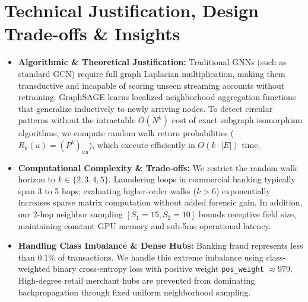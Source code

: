 \documentclass[11pt, a4paper]{article}
\begin{document}
\section{Technical Justification, Design Trade-offs \& Insights}
\begin{itemize}[noitemsep, topsep=2pt]
    \item \textbf{Algorithmic \& Theoretical Justification:} Traditional GNNs (such as standard GCN) require full graph Laplacian multiplication, making them transductive and incapable of scoring unseen streaming accounts without retraining. GraphSAGE learns localized neighborhood aggregation functions that generalize inductively to newly arriving nodes. To detect circular patterns without the intractable $O(N^k)$ cost of exact subgraph isomorphism algorithms, we compute random walk return probabilities ($R_k(u) = (P^k)_{uu}$), which execute efficiently in $O(k \cdot |E|)$ time.
    \item \textbf{Computational Complexity \& Trade-offs:} We restrict the random walk horizon to $k \in \{2, 3, 4, 5\}$. Laundering loops in commercial banking typically span 3 to 5 hops; evaluating higher-order walks ($k > 6$) exponentially increases sparse matrix computation without added forensic gain. In addition, our 2-hop neighbor sampling $[S_1=15, S_2=10]$ bounds receptive field size, maintaining constant GPU memory and sub-5ms operational latency.
    \item \textbf{Handling Class Imbalance \& Dense Hubs:} Banking fraud represents less than 0.1\% of transactions. We handle this extreme imbalance using class-weighted binary cross-entropy loss with positive weight \texttt{pos\_weight} $\approx 979$. High-degree retail merchant hubs are prevented from dominating backpropagation through fixed uniform neighborhood sampling.
\end{itemize}

\end{document}
